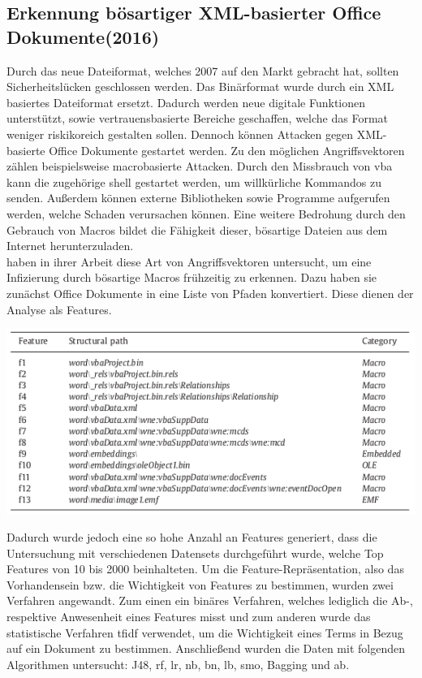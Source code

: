 \documentclass[
    12pt, %
    DIV10,
    ngerman, %
    a4paper, %
    oneside, %
    titlepage, %
    parskip=half, %
    headings=normal, %
    listof=totoc, %
    bibliography=totoc, %
    index=totoc, %
    captions=tableheading, %
    final %
]{scrreprt}
\begin{document}
\subsection{Erkennung bösartiger XML-basierter Office Dokumente(2016)}
Durch das neue Dateiformat, welches  2007 auf den Markt gebracht hat, sollten Sicherheitslücken geschlossen werden.
Das Binärformat wurde durch ein	XML basiertes Dateiformat ersetzt. Dadurch werden neue digitale Funktionen unterstützt, sowie vertrauensbasierte Bereiche geschaffen, welche das Format weniger riskikoreich gestalten sollen. Dennoch können Attacken gegen XML-basierte Office Dokumente gestartet werden. Zu den möglichen Angriffsvektoren zählen beispielsweise macrobasierte Attacken. Durch den Missbrauch von \ac{vba} kann die zugehörige shell gestartet werden, um willkürliche Kommandos zu senden. Au{\ss}erdem können externe Bibliotheken sowie Programme aufgerufen werden, welche Schaden verursachen können. Eine weitere Bedrohung durch den Gebrauch von Macros bildet die Fähigkeit dieser, bösartige Dateien aus dem Internet herunterzuladen.\\
\textcite{Cohen2016} haben in ihrer Arbeit diese Art von Angriffsvektoren untersucht, um eine Infizierung durch bösartige Macros frühzeitig zu erkennen. Dazu haben sie zunächst Office Dokumente in eine Liste von Pfaden konvertiert. Diese dienen der Analyse als Features.
\begin{center}
\includegraphics[scale=0.6]{img/pfade.png}
\label{fig:pe}
\end{center}
Dadurch wurde jedoch eine so hohe Anzahl an Features generiert, dass die Untersuchung mit verschiedenen Datensets durchgeführt wurde, welche Top Features von 10 bis 2000 beinhalteten. Um die Feature-Repräsentation, also das Vorhandensein bzw. die Wichtigkeit von Features zu bestimmen, wurden zwei Verfahren angewandt. Zum einen ein binäres Verfahren, welches lediglich die Ab-, respektive Anwesenheit eines Features misst und zum anderen wurde das statistische Verfahren \ac{tfidf} verwendet, um die Wichtigkeit eines Terms in Bezug auf ein Dokument zu bestimmen. Anschlie{\ss}end wurden die Daten mit folgenden Algorithmen untersucht: J48, \ac{rf}, \ac{lr}, \ac{nb}, \ac{bn}, \ac{lb}, \ac{smo}, Bagging und \ac{ab}. \\\\
\end{document}
